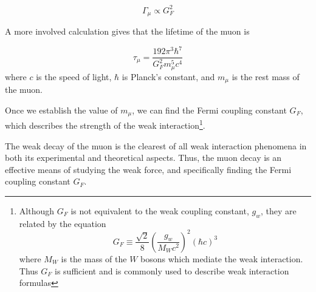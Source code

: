 \begin{equation}\Gamma_{\mu} \propto G_F^2 \end{equation}

A more involved calculation \cite[p.~310-314]{griffiths} gives that the
lifetime of the muon is

\begin{equation}\tau_{\mu} = \dfrac{192\pi^3\hbar^7}{G_F^2m_{\mu}^5c^4}\end{equation}
where $c$ is the speed of light, $\hbar$ is Planck's constant, and
$m_{\mu}$ is the rest mass of the muon. 

Once we establish the value of $m_{\mu}$, we can find the Fermi
coupling constant $G_F$, which describes the strength of the weak
interaction\footnote{Although $G_F$ is not equivalent to the weak
coupling constant, $g_w$, they are related by the equation
\[G_F\equiv \frac{\sqrt{2}}{8}\left(\frac{g_w}{M_Wc^2}\right)^2(\hbar c)^3\]
where $M_W$ is the mass of the $W$ bosons which mediate the weak
interaction. Thus $G_F$ is sufficient and is commonly used to describe
weak interaction formulas\cite[p.~313]{griffiths}}.

The weak decay of the muon is the clearest of all weak interaction
phenomena in both its experimental and theoretical aspects. Thus, the
muon decay is an effective means of studying the weak force, and
specifically finding the Fermi coupling constant $G_F$.
